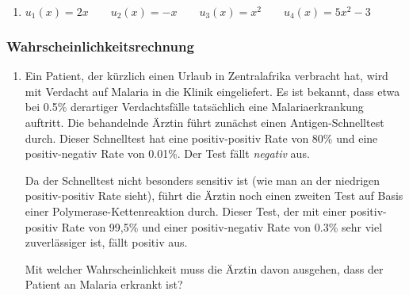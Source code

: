\begin{enumerate}
\begin{enumerate}
  \item $u_1(x) = 2x \qquad u_2(x) = -x \qquad u_3(x)=x^2 \qquad 
  u_4(x) = 5x^2-3$
\end{enumerate}

\end{enumerate}

\subsubsection{Wahrscheinlichkeitsrechnung}

\begin{enumerate}
  \item Ein Patient, der kürzlich einen Urlaub in Zentralafrika verbracht hat,
  wird mit Verdacht auf Malaria in die Klinik eingeliefert. Es ist bekannt, dass etwa
  bei 0.5\% derartiger Verdachtsfälle tatsächlich eine Malariaerkrankung
  auftritt. Die behandelnde Ärztin führt zunächst einen Antigen-Schnelltest
  durch. Dieser Schnelltest hat eine
  positiv-positiv Rate von 80\% und eine positiv-negativ Rate von 0.01\%.
  Der Test fällt {\em negativ} aus.
  
  Da der Schnelltest nicht besonders sensitiv ist (wie man an der niedrigen
  positiv-positiv Rate sieht), führt die Ärztin noch einen zweiten Test auf
  Basis einer Polymerase-Kettenreaktion durch. Dieser Test, der mit einer 
  positiv-positiv Rate von 99,5\% und einer positiv-negativ Rate
  von 0.3\% sehr viel zuverlässiger ist, fällt positiv aus.
  
  Mit welcher Wahrscheinlichkeit muss die Ärztin davon ausgehen, dass der
  Patient an Malaria erkrankt ist?


\end{enumerate}
